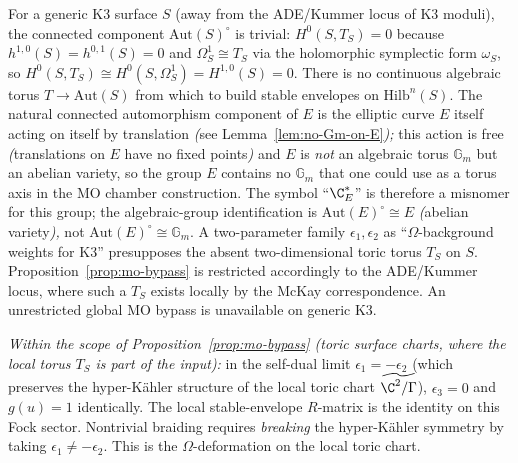 \begin{remark}
\label{rem:generic-k3-no-mo}
For a generic K3 surface $S$ (away from the ADE/Kummer locus of
K3 moduli), the connected component
$\mathrm{Aut}(S)^\circ$ is trivial: $H^0(S, T_S) = 0$ because
$h^{1,0}(S) = h^{0,1}(S) = 0$ and $\Omega^1_S \cong T_S$ via the
holomorphic symplectic form $\omega_S$, so
$H^0(S, T_S) \cong H^0(S, \Omega^1_S) = H^{1,0}(S) = 0$.
There is no continuous algebraic torus $T \to \mathrm{Aut}(S)$
from which to build stable envelopes on $\mathrm{Hilb}^n(S)$.
The natural connected automorphism component of $E$ is the
elliptic curve $E$ itself acting on itself by translation
\emph{(}see Lemma~\ref{lem:no-Gm-on-E}\emph{);} this action is
free \emph{(}translations on $E$ have no fixed points\emph{)} and
$E$ is \emph{not} an algebraic torus $\mathbb{G}_m$ but an
abelian variety, so the group $E$ contains no $\mathbb{G}_m$
that one could use as a torus axis in the MO chamber
construction. The symbol ``$\C^*_E$'' is therefore a misnomer for
this group; the algebraic-group identification is
$\mathrm{Aut}(E)^\circ \cong E$
\emph{(}abelian variety\emph{),} not $\mathrm{Aut}(E)^\circ \cong
\mathbb{G}_m$. A two-parameter family $\epsilon_1, \epsilon_2$ as
``$\Omega$-background weights for K3'' presupposes the absent
two-dimensional toric torus $T_S$ on $S$. Proposition~\ref{prop:mo-bypass}
is restricted accordingly to the ADE/Kummer locus, where such a
$T_S$ exists locally by the McKay correspondence. An unrestricted
global MO bypass is unavailable on generic K3.
\end{remark}

\begin{remark}
\label{rem:selfdual-trivial}
\textit{Within the scope of Proposition~\textup{\ref{prop:mo-bypass}}
\textup{(}toric surface charts, where the local torus \(T_S\) is part
of the input\textup{):}}
in the self-dual limit $\epsilon_1 = -\epsilon_2$
(which preserves the hyper-K\"ahler structure of the local toric
chart $\widetilde{\C^2/\Gamma}$), $\epsilon_3 = 0$ and $g(u) = 1$
identically. The local stable-envelope \(R\)-matrix is the identity on
this Fock sector. Nontrivial
braiding requires \emph{breaking} the hyper-K\"ahler symmetry by
taking $\epsilon_1 \neq -\epsilon_2$. This is the $\Omega$-deformation
on the local toric chart.
\end{remark}

